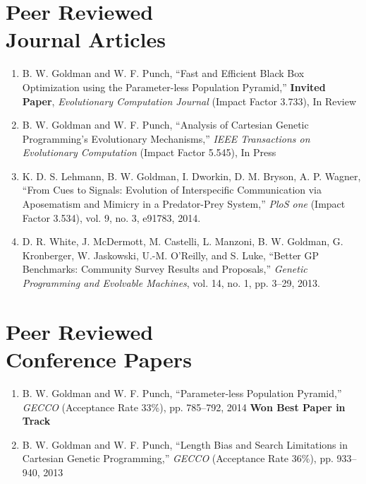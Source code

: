 \documentclass[margin,line]{resume}
\begin{document}
\begin{resume}
    \section{\mysidestyle Peer Reviewed\\Journal Articles}

    \begin{enumerate}
    \item
    B. W. Goldman and W. F. Punch,
    ``Fast and Efficient Black Box Optimization using the Parameter-less Population Pyramid,''
    \textbf{Invited Paper}, \textsl{Evolutionary Computation Journal} (Impact Factor 3.733), In Review

    \item
    B. W. Goldman and W. F. Punch,
    ``Analysis of Cartesian Genetic Programming's Evolutionary Mechanisms,''
    \textsl{IEEE Transactions on Evolutionary Computation} (Impact Factor 5.545), In Press

    \item
    K. D. S. Lehmann,  B. W. Goldman, I. Dworkin, D. M. Bryson, A. P. Wagner,
    ``From Cues to Signals: Evolution of Interspecific Communication via Aposematism and Mimicry in a Predator-Prey System,''
    \textsl{PloS one} (Impact Factor 3.534), vol. 9, no. 3, e91783, 2014.

    \item
    D. R. White, J. McDermott, M. Castelli, L. Manzoni, B. W. Goldman,
    G. Kronberger, W. Jaskowski, U.-M. O’Reilly, and S. Luke,
    ``Better GP Benchmarks: Community Survey Results and Proposals,''
    \textsl{Genetic Programming and Evolvable Machines}, vol. 14, no. 1, pp. 3--29, 2013.    
    \end{enumerate}

    \section{\mysidestyle Peer Reviewed\\Conference Papers}
    \begin{enumerate}
    
    \item
    B. W. Goldman and W. F. Punch,
    ``Parameter-less Population Pyramid,''
    \textsl{GECCO} (Acceptance Rate 33\%), pp. 785--792, 2014
    \textbf{Won Best Paper in Track}
        
    \item
    B. W. Goldman and W. F. Punch,
    ``Length Bias and Search Limitations in Cartesian Genetic Programming,''
    \textsl{GECCO} (Acceptance Rate 36\%), pp. 933--940, 2013


\end{enumerate}
\end{resume}
\end{document}
